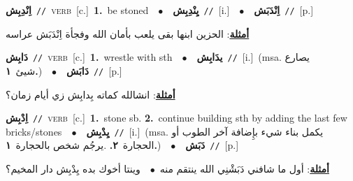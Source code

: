 \documentclass[10pt,a4paper,twoside]{article} %
\begin{document}
\begin{multicols}{2}
{{{{\setlength\topsep{0pt}\textbf{\foreignlanguage{arabic}{اِنْدِبِش}}\ {\color{gray}\texttt{//}\color{black}}\ \textsc{verb}\ [c.]\ \textbf{1.}~be stoned\ \ $\bullet$\ \ \setlength\topsep{0pt}\textbf{\foreignlanguage{arabic}{يِنْدِبِش}}\ {\color{gray}\texttt{//}\color{black}}\ [i.]\ \ $\bullet$\ \ \setlength\topsep{0pt}\textbf{\foreignlanguage{arabic}{اِنْدَبَش}}\ {\color{gray}\texttt{//}\color{black}}\ [p.]\  \begin{flushright}\color{gray}\foreignlanguage{arabic}{\textbf{\underline{\foreignlanguage{arabic}{أمثلة}}}: الحزين ابنها بقى يلعب بأمان الله وفجأة اِنْدَبَش عراسه}\end{flushright}\color{black}} \vspace{2mm}

{\setlength\topsep{0pt}\textbf{\foreignlanguage{arabic}{دَابِش}}\ {\color{gray}\texttt{//}\color{black}}\ \textsc{verb}\ [c.]\ \textbf{1.}~wrestle with sth\ \ $\bullet$\ \ \setlength\topsep{0pt}\textbf{\foreignlanguage{arabic}{يدَابِش}}\ {\color{gray}\texttt{//}\color{black}}\ [i.]\ \color{gray}(msa. \foreignlanguage{arabic}{يصارع شيئ}~\foreignlanguage{arabic}{\textbf{١.}})\color{black}\ \ $\bullet$\ \ \setlength\topsep{0pt}\textbf{\foreignlanguage{arabic}{دَابَش}}\ {\color{gray}\texttt{//}\color{black}}\ [p.]\  \begin{flushright}\color{gray}\foreignlanguage{arabic}{\textbf{\underline{\foreignlanguage{arabic}{أمثلة}}}: انشالله كماته بِدابِش زي أيام زمان؟}\end{flushright}\color{black}} \vspace{2mm}

{\setlength\topsep{0pt}\textbf{\foreignlanguage{arabic}{اِدْبِش}}\ {\color{gray}\texttt{//}\color{black}}\ \textsc{verb}\ [c.]\ \textbf{1.}~stone sb.  \textbf{2.}~continue building sth by adding the last few bricks/stones\ \ $\bullet$\ \ \setlength\topsep{0pt}\textbf{\foreignlanguage{arabic}{يِدْبِش}}\ {\color{gray}\texttt{//}\color{black}}\ [i.]\ \color{gray}(msa. \foreignlanguage{arabic}{يكمل بناء شيء بإِضافة آخر الطوب أو الحجارة}~\foreignlanguage{arabic}{\textbf{٢.}}  .\foreignlanguage{arabic}{يرجُم شخص بالحجارة}~\foreignlanguage{arabic}{\textbf{١.}})\color{black}\ \ $\bullet$\ \ \setlength\topsep{0pt}\textbf{\foreignlanguage{arabic}{دَبَش}}\ {\color{gray}\texttt{//}\color{black}}\ [p.]\  \begin{flushright}\color{gray}\foreignlanguage{arabic}{\textbf{\underline{\foreignlanguage{arabic}{أمثلة}}}: أول ما شافني دَبَشْنِي الله ينتقم منه\ $\bullet$\ \  وينتا أخوك بده يِدْبِش دار المخيم؟}\end{flushright}\color{black}} \vspace{2mm}

}}}
\end{multicols}
\end{document}
